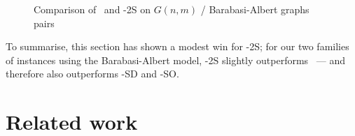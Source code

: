 \begin{figure}[htb]
    \centering
    \caption{Comparison of \McSplit\ and \McSplit-2S on $G(n,m)$ / Barabasi-Albert graphs pairs}
    \label{figure:mcsplit-vs-mcsplit2-ba-gnm}
\end{figure}

To summarise, this section has shown a modest win for \McSplit-2S; for our two families of
instances using the Barabasi-Albert model, \McSplit-2S slightly outperforms \McSplit\ --- and therefore
also outperforms \McSplit-SD and \McSplit-SO.


\section{Related work}\label{sec:swapping-related-work}

